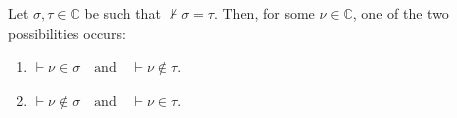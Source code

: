 \begin{lemma}
    \label{lem:C.exists_mem_and_notin_of_not_eq}
    \leanok
    Let $\sigma, \tau \in \mathbb{C}$ be such that $\not\vdash \sigma = \tau$. 
    Then, for some $\nu \in \mathbb{C}$, one of the two possibilities occurs:
    \begin{enumerate}
        \item $\vdash \nu \in \sigma \quad \text{and} \quad \vdash \nu \notin \tau$.
        \item $\vdash \nu \notin \sigma \quad \text{and} \quad \vdash \nu \in \tau$.
    \end{enumerate}
\end{lemma}


